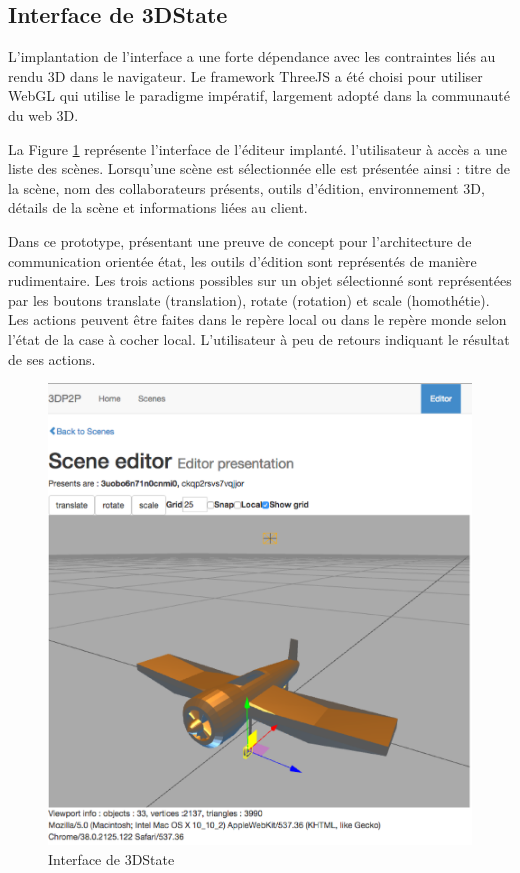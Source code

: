 \subsection{Interface de 3DState}
L'implantation de l'interface a une forte dépendance avec les contraintes liés au 
rendu 3D dans le navigateur. Le framework ThreeJS a été choisi pour utiliser 
WebGL qui utilise le paradigme impératif, largement adopté dans la communauté 
du web 3D.

La Figure \ref{fig:3Dstateinterface} représente l'interface de l'éditeur implanté. 
l'utilisateur à accès a une liste des scènes. Lorsqu'une scène est sélectionnée elle 
est présentée ainsi : titre de la scène, nom des collaborateurs présents, outils 
d'édition, environnement 3D, détails de la scène et informations liées au client.


Dans ce prototype, présentant une preuve de concept pour l'architecture de 
communication orientée état, les outils d'édition sont représentés de manière 
rudimentaire. Les trois actions possibles sur un objet sélectionné sont 
représentées par les boutons \og translate\fg{} (translation), \og rotate\fg{} 
(rotation) et \og scale\fg{} (homothétie). Les actions peuvent être faites dans le 
repère \og local\fg{} ou dans le repère \og monde\fg{} selon l'état de la case à 
cocher \og local\fg{}. L'utilisateur à peu de retours indiquant le résultat de ses 
actions.

\begin{figure}
	\centering
	\includegraphics[width=0.6\columnwidth]{eps/editorpresentation.eps}
	\caption{Interface de 3DState}
	\label{fig:3Dstateinterface}
\end{figure}

